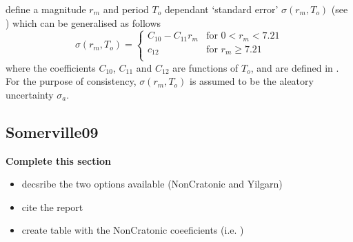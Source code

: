 \cite{dr_Sadigh97a} define a magnitude $r_m$ and period $T_o$
dependant `standard error' $\sigma(r_m,T_o)$ (see \citealt[Table
3]{dr_Sadigh97a}) which can be generalised as follows
\begin{equation}
\sigma(r_m,T_o) = \left \{ \begin{array}{ll}
C_{10}-C_{11}r_m & \textrm{for $0<r_m<7.21$} \\
c_{12} & \textrm{for $r_m \geq 7.21$} \\
\end{array} \right.
\end{equation}
where the coefficients $C_{10}$, $C_{11}$ and $C_{12}$ are functions
of $T_o$, and are defined in \cite[Table A-14]{dr_Campbell03a}. For
the purpose of consistency, $\sigma(r_m,T_o)$ is assumed to be the
aleatory uncertainty $\sigma_a$.


\subsection{Somerville09}
\textbf{Complete this section}
\begin{itemize}
\item decsribe the two options available (NonCratonic and Yilgarn)
\item cite the report
\item create table with the NonCratonic coeeficients (i.e.
)
\end{itemize}

